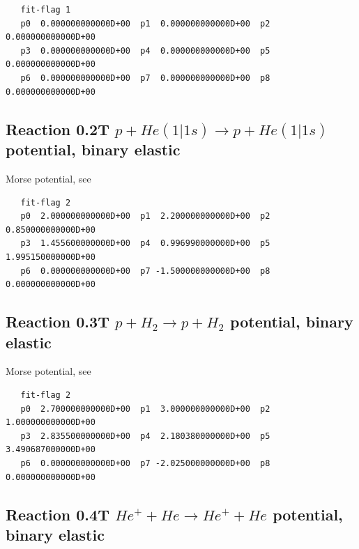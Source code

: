 \documentclass[12pt,dvips]{article}
\begin{document}
\begin{small}\begin{verbatim}
   fit-flag 1
   p0  0.000000000000D+00  p1  0.000000000000D+00  p2  0.000000000000D+00
   p3  0.000000000000D+00  p4  0.000000000000D+00  p5  0.000000000000D+00
   p6  0.000000000000D+00  p7  0.000000000000D+00  p8  0.000000000000D+00
\end{verbatim}\end{small}


\newpage

\subsection{
Reaction 0.2T   $ p + He(1|1s) \rightarrow p + He (1|1s) $
potential, binary elastic}

Morse potential, see \cite{kn:Bachmann}

\begin{small}\begin{verbatim}
   fit-flag 2
   p0  2.000000000000D+00  p1  2.200000000000D+00  p2  0.850000000000D+00
   p3  1.455600000000D+00  p4  0.996990000000D+00  p5  1.995150000000D+00
   p6  0.000000000000D+00  p7 -1.500000000000D+00  p8  0.000000000000D+00
\end{verbatim}\end{small}


\newpage

\subsection{
Reaction 0.3T    $p + H_2 \rightarrow p + H_2 $ potential, binary elastic
}

Morse potential, see \cite{kn:Bachmann}
\begin{small}\begin{verbatim}
   fit-flag 2
   p0  2.700000000000D+00  p1  3.000000000000D+00  p2  1.000000000000D+00
   p3  2.835500000000D+00  p4  2.180380000000D+00  p5  3.490687000000D+00
   p6  0.000000000000D+00  p7 -2.025000000000D+00  p8  0.000000000000D+00
\end{verbatim}\end{small}


\newpage

\subsection{
Reaction 0.4T   $  He^+ + He \rightarrow He^+ + He $ potential, binary elastic
}
\end{document}
